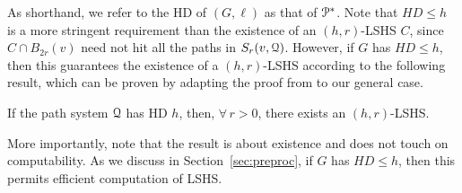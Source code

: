 As shorthand, we refer to the HD of $(G,\ell)$ as that of $\mathcal{P}^*$. 
Note that $HD\leq h$ is a more stringent requirement than the existence of an $(h,r)$-LSHS $C$, since $C\cap B_{2r}(v)$ need not hit all the paths in $S_r(v,\mathcal{Q})$. 
However, if $G$ has $HD \leq h$, then this guarantees the existence of a $(h,r)$-LSHS according to the following result, which can be proven by adapting the proof from \cite[Theorem 4.2]{hd_journal} to our general case.
\begin{proposition}\label{prop:equiv}
If the path system $\mathcal{Q}$ has HD $h$, then, $\forall\,r>0$, there exists an $(h,r)$-LSHS.
\end{proposition}

More importantly, note that the result is about existence and does not touch on computability.
As we discuss in Section~\ref{sec:preproc}, if $G$ has $HD \leq h$, then this permits efficient computation of LSHS.